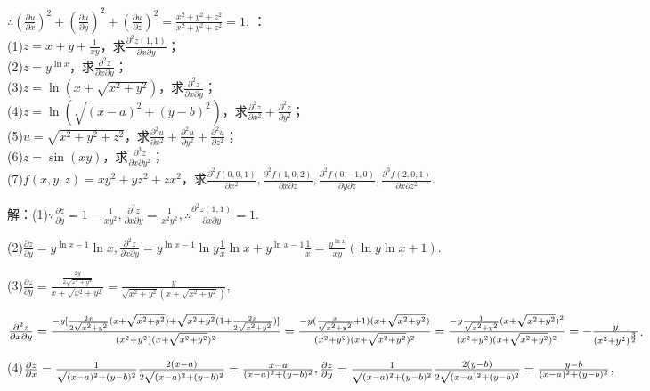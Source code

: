 \documentclass[12pt,UTF8]{ctexart}
\begin{document}
\begin{enumerate}
$\therefore(\frac{\partial u}{\partial x})^2+(\frac{\partial u}{\partial y})^2+(\frac{\partial u}{\partial z})^2=\frac{x^2+y^2+z^2}{x^2+y^2+z^2}=1$.
：
\\
(1)$z=x+y+\frac1{xy}$，求$\frac{\partial^2z(1,1)}{\partial x\partial y}$；
\\
(2)$z=y^{\ln x}$，求$\frac{\partial^2z}{\partial x\partial y}$；
\\
(3)$z=\ln(x+\sqrt{x^2+y^2})$，求$\frac{\partial^2z}{\partial x\partial y}$；
\\
(4)$z=\ln(\sqrt{(x-a)^2+(y-b)^2})$，求$\frac{\partial^2z}{\partial x^2}+\frac{\partial^2z}{\partial y^2}$；
\\
(5)$u=\sqrt{x^2+y^2+z^2}$，求$\frac{\partial^2u}{\partial x^2}+\frac{\partial^2u}{\partial y^2}+\frac{\partial^2u}{\partial z^2}$；
\\
(6)$z=\sin(xy)$，求$\frac{\partial^3z}{\partial x\partial y^2}$；
\\
(7)$f(x,y,z)=xy^2+yz^2+zx^2$，求$\frac{\partial^2f(0,0,1)}{\partial x^2},\frac{\partial^2f(1,0,2)}{\partial x\partial z},\frac{\partial^2f(0,-1,0)}{\partial y\partial z},\frac{\partial^3f(2,0,1)}{\partial x\partial z^2}$.

解：(1)$\because\frac{\partial z}{\partial y}=1-\frac1{xy^2},\frac{\partial^2z}{\partial x\partial y}=\frac1{x^2y^2},\therefore\frac{\partial^2z(1,1)}{\partial x\partial y}=1$.

(2)$\frac{\partial z}{\partial y}=y^{\ln x-1}\ln x,\frac{\partial^2z}{\partial x\partial y}=y^{\ln x-1}\ln y\frac1x\ln x+y^{\ln x-1}\frac1x=\frac{y^{\ln x}}{xy}(\ln y\ln x+1)$.

(3)$\frac{\partial z}{\partial y}=\frac{\frac{2y}{2\sqrt{x^2+y^2}}}{x+\sqrt{x^2+y^2}}=\frac y{\sqrt{x^2+y^2}(x+\sqrt{x^2+y^2})}$,

$\frac{\partial^2z}{\partial x\partial y}=\frac{-y[\frac{2x}{2\sqrt{x^2+y^2}}(x+\sqrt{x^2+y^2})+\sqrt{x^2+y^2}(1+\frac{2x}{2\sqrt{x^2+y^2}})]}{(x^2+y^2)(x+\sqrt{x^2+y^2})^2}=\frac{-y(\frac{x}{\sqrt{x^2+y^2}}+1)(x+\sqrt{x^2+y^2})}{(x^2+y^2)(x+\sqrt{x^2+y^2})^2}\\
=\frac{-y\frac1{\sqrt{x^2+y^2}}(x+\sqrt{x^2+y^2})^2}{(x^2+y^2)(x+\sqrt{x^2+y^2})^2}=-\frac y{(x^2+y^2)^{\frac32}}$.

(4)$\frac{\partial z}{\partial x}=\frac1{\sqrt{(x-a)^2+(y-b)^2}}\frac{2(x-a)}{2\sqrt{(x-a)^2+(y-b)^2}}=\frac{x-a}{(x-a)^2+(y-b)^2},\\
\frac{\partial z}{\partial y}=\frac1{\sqrt{(x-a)^2+(y-b)^2}}\frac{2(y-b)}{2\sqrt{(x-a)^2+(y-b)^2}}=\frac{y-b}{(x-a)^2+(y-b)^2}$,


\end{enumerate}
\end{document}
